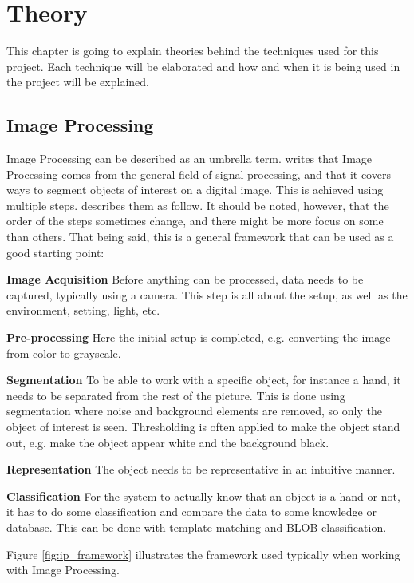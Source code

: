 \chapter{Theory}
This chapter is going to explain theories behind the techniques used for this project. Each technique will be elaborated and how and when it is being used in the project will be explained.


\section{Image Processing}
Image Processing can be described as an umbrella term. \citep{ip_book} writes that Image Processing comes from the general field of signal processing, and that it covers ways to segment objects of interest on a digital image. This is achieved using multiple steps. \citep{ip_book} describes them as follow. It should be noted, however, that the order of the steps sometimes change, and there might be more focus on some than others. That being said, this is a general framework that can be used as a good starting point:

\textbf{Image Acquisition}
Before anything can be processed, data needs to be captured, typically using a camera. This step is all about the setup, as well as the environment, setting, light, etc.

\textbf{Pre-processing}
Here the initial setup is completed, e.g. converting the image from color to grayscale.

\textbf{Segmentation}
To be able to work with a specific object, for instance a hand, it needs to be separated from the rest of the picture. This is done using segmentation where noise and background elements are removed, so only the object of interest is seen. Thresholding is often applied to make the object stand out, e.g. make the object appear white and the background black.

\textbf{Representation}
The object needs to be representative in an intuitive manner.

\textbf{Classification}
For the system to actually know that an object is a hand or not, it has to do some classification and compare the data to some knowledge or database. This can be done with template matching and BLOB classification.

Figure \eqref{fig:ip_framework} illustrates the framework used typically when working with Image Processing.

